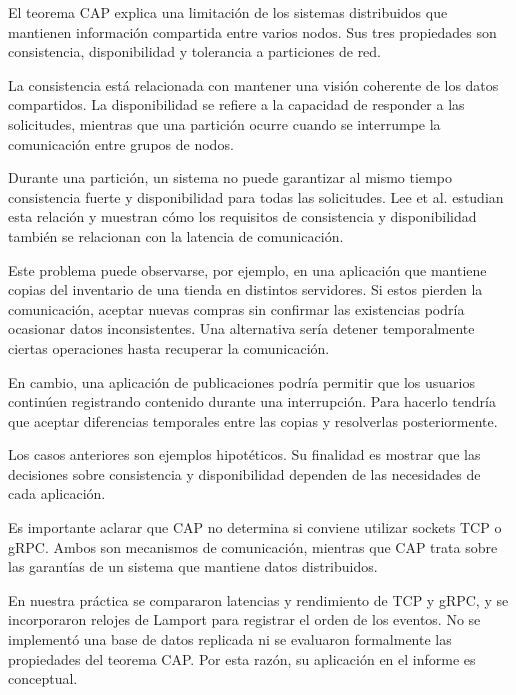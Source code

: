 El teorema CAP explica una limitación
de los sistemas distribuidos que
mantienen información compartida entre
varios nodos. Sus tres propiedades son
consistencia, disponibilidad y tolerancia
a particiones de red.

La consistencia está relacionada con
mantener una visión coherente de los
datos compartidos. La disponibilidad
se refiere a la capacidad de responder
a las solicitudes, mientras que una
partición ocurre cuando se interrumpe
la comunicación entre grupos de nodos.

Durante una partición, un sistema no
puede garantizar al mismo tiempo
consistencia fuerte y disponibilidad
para todas las solicitudes. Lee et al.
\cite{lee2023cap} estudian esta
relación y muestran cómo los requisitos
de consistencia y disponibilidad
también se relacionan con la latencia
de comunicación.

Este problema puede observarse, por
ejemplo, en una aplicación que mantiene
copias del inventario de una tienda
en distintos servidores. Si estos
pierden la comunicación, aceptar
nuevas compras sin confirmar las
existencias podría ocasionar datos
inconsistentes. Una alternativa
sería detener temporalmente ciertas
operaciones hasta recuperar la
comunicación.

En cambio, una aplicación de
publicaciones podría permitir que
los usuarios continúen registrando
contenido durante una interrupción.
Para hacerlo tendría que aceptar
diferencias temporales entre las
copias y resolverlas posteriormente.

Los casos anteriores son ejemplos
hipotéticos. Su finalidad es mostrar
que las decisiones sobre consistencia
y disponibilidad dependen de las
necesidades de cada aplicación.

Es importante aclarar que CAP no
determina si conviene utilizar sockets
TCP o gRPC. Ambos son mecanismos de
comunicación, mientras que CAP trata
sobre las garantías de un sistema que
mantiene datos distribuidos.

En nuestra práctica se compararon
latencias y rendimiento de TCP y gRPC,
y se incorporaron relojes de Lamport
para registrar el orden de los eventos.
No se implementó una base de datos
replicada ni se evaluaron formalmente
las propiedades del teorema CAP.
Por esta razón, su aplicación en
el informe es conceptual.
